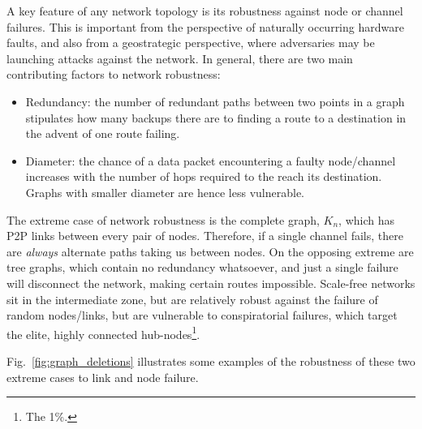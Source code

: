 A key feature of any network topology is its robustness against node or channel failures. This is important from the perspective of naturally occurring hardware faults, and also from a geostrategic perspective, where adversaries may be launching attacks against the network. In general, there are two main contributing factors to network robustness:
\begin{itemize}
	\item Redundancy: the number of redundant paths between two points in a graph stipulates how many backups there are to finding a route to a destination in the advent of one route failing.
	\item Diameter: the chance of a data packet encountering a faulty node/channel increases with the number of hops required to the reach its destination. Graphs with smaller diameter are hence less vulnerable.
\end{itemize}

The extreme case of network robustness is the complete graph, $K_n$, which has P2P links between every pair of nodes. Therefore, if a single channel fails, there are \textit{always} alternate paths taking us between nodes. On the opposing extreme are tree graphs, which contain no redundancy whatsoever, and just a single failure will disconnect the network, making certain routes impossible. Scale-free networks sit in the intermediate zone, but are relatively robust against the failure of random nodes/links, but are vulnerable to conspiratorial failures, which target the elite, highly connected hub-nodes\footnote{The 1\%.}.

Fig.~\ref{fig:graph_deletions} illustrates some examples of the robustness of these two extreme cases to link and node failure.

